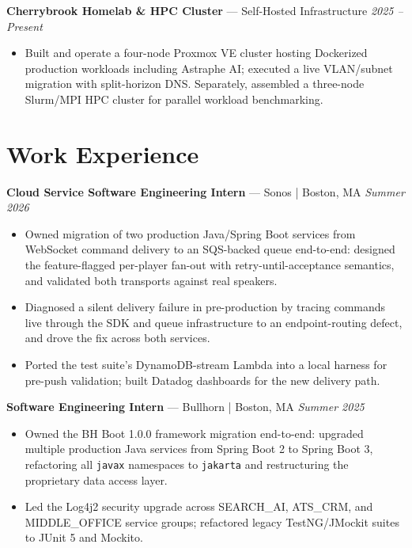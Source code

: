 \documentclass[10pt, letterpaper]{article}
\begin{document}
\vspace{1pt}\noindent
\textbf{Cherrybrook Homelab \& HPC Cluster} --- Self-Hosted Infrastructure
\hfill \textit{2025 -- Present}
\begin{itemize}
  \item Built and operate a four-node Proxmox VE cluster hosting Dockerized production
    workloads including Astraphe AI; executed a live VLAN/subnet migration with
    split-horizon DNS. Separately, assembled a three-node Slurm/MPI HPC cluster for
    parallel workload benchmarking.
\end{itemize}

\section{Work Experience}

\noindent
\textbf{Cloud Service Software Engineering Intern} --- Sonos | Boston, MA
\hfill \textit{Summer 2026}
\begin{itemize}
  \item Owned migration of two production Java/Spring Boot services from WebSocket command
    delivery to an SQS-backed queue end-to-end: designed the feature-flagged per-player
    fan-out with retry-until-acceptance semantics, and validated both transports against
    real speakers.
  \item Diagnosed a silent delivery failure in pre-production by tracing commands live
    through the SDK and queue infrastructure to an endpoint-routing defect, and drove the
    fix across both services.
  \item Ported the test suite's DynamoDB-stream Lambda into a local harness for pre-push
    validation; built Datadog dashboards for the new delivery path.
\end{itemize}

\vspace{1pt}\noindent
\textbf{Software Engineering Intern} --- Bullhorn | Boston, MA
\hfill \textit{Summer 2025}
\begin{itemize}
  \item Owned the BH Boot 1.0.0 framework migration end-to-end: upgraded multiple
    production Java services from Spring Boot 2 to Spring Boot 3, refactoring all
    \texttt{javax} namespaces to \texttt{jakarta} and restructuring the proprietary data
    access layer.
  \item Led the Log4j2 security upgrade across SEARCH\_AI, ATS\_CRM, and MIDDLE\_OFFICE
    service groups; refactored legacy TestNG/JMockit suites to JUnit 5 and Mockito.
\end{itemize}
\end{document}
